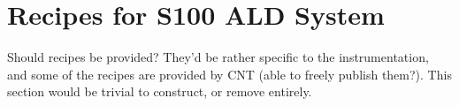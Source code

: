 \clearpage
%
%



\section{Recipes for S100 ALD System}
\label{sup:recipes}

Should recipes be provided? They'd be rather specific to the instrumentation, and some of the recipes are provided by CNT (able to freely publish them?). This section would be trivial to construct, or remove entirely. 
%
%
\clearpage

